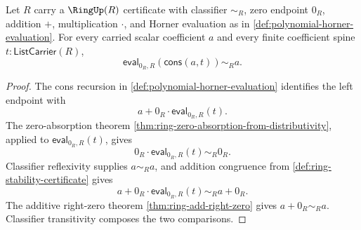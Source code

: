 \begin{lemma}
\label{lem:horner-evaluation-zero-cons-constant}
Let $R$ carry a $\RingUp(R)$ certificate with classifier $\sim_R$, zero endpoint $0_R$, addition $+$, multiplication $\cdot$, and Horner evaluation as in \autoref{def:polynomial-horner-evaluation}. For every carried scalar coefficient $a$ and every finite coefficient spine $t:\mathsf{ListCarrier}(R)$,
$$
\mathsf{eval}_{0_R,R}(\mathsf{cons}(a,t))\sim_R a.
$$
\end{lemma}
\begin{proof}
The cons recursion in \autoref{def:polynomial-horner-evaluation} identifies the left endpoint with
$$
a+0_R\cdot\mathsf{eval}_{0_R,R}(t).
$$
The zero-absorption theorem \autoref{thm:ring-zero-absorption-from-distributivity}, applied to $\mathsf{eval}_{0_R,R}(t)$, gives
$$
0_R\cdot\mathsf{eval}_{0_R,R}(t)\sim_R0_R.
$$
Classifier reflexivity supplies $a\sim_Ra$, and addition congruence from \autoref{def:ring-stability-certificate} gives
$$
a+0_R\cdot\mathsf{eval}_{0_R,R}(t)\sim_Ra+0_R.
$$
The additive right-zero theorem \autoref{thm:ring-add-right-zero} gives $a+0_R\sim_Ra$. Classifier transitivity composes the two comparisons.
\end{proof}

